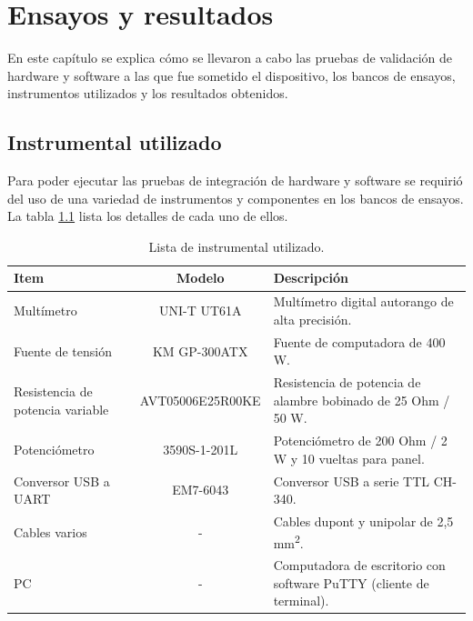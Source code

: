 
\chapter{Ensayos y resultados} %

\label{Chapter4} %


En este capítulo se explica cómo se llevaron a cabo las pruebas de validación de hardware y software a las que fue sometido el dispositivo, los bancos de ensayos, instrumentos utilizados y los resultados obtenidos.

\section{Instrumental utilizado}

Para poder ejecutar las pruebas de integración de hardware y software se requirió del uso de una variedad de instrumentos y componentes en los bancos de ensayos. La tabla \ref{tab:instrumentos} lista los detalles de cada uno de ellos.

\begin{table}[H]
	\centering
	\caption{Lista de instrumental utilizado.}
	\begin{tabular}{p{3cm} c p{6cm}}
		\toprule
		\textbf{Item} & \textbf{Modelo} & \textbf{Descripción} \\
		\midrule
		Multímetro			& UNI-T UT61A		& Multímetro digital autorango de alta precisión. \\
		Fuente de tensión	& KM GP-300ATX		& Fuente de computadora de 400 W. \\
		Resistencia de potencia variable		& AVT05006E25R00KE	& Resistencia de potencia de alambre bobinado de 25 Ohm / 50 W. \\
		Potenciómetro							& 3590S-1-201L & Potenciómetro de 200 Ohm / 2 W y 10 vueltas para panel. \\
		Conversor USB a UART					& EM7-6043		& Conversor USB a serie TTL CH-340. \\
		Cables varios							& - 			& Cables dupont y unipolar de 2,5 mm\textsuperscript{2}. \\
		PC										& -				& Computadora de escritorio con software PuTTY (cliente de terminal). \\
		\bottomrule
		\hline
	\end{tabular}
	\label{tab:instrumentos}
\end{table}


